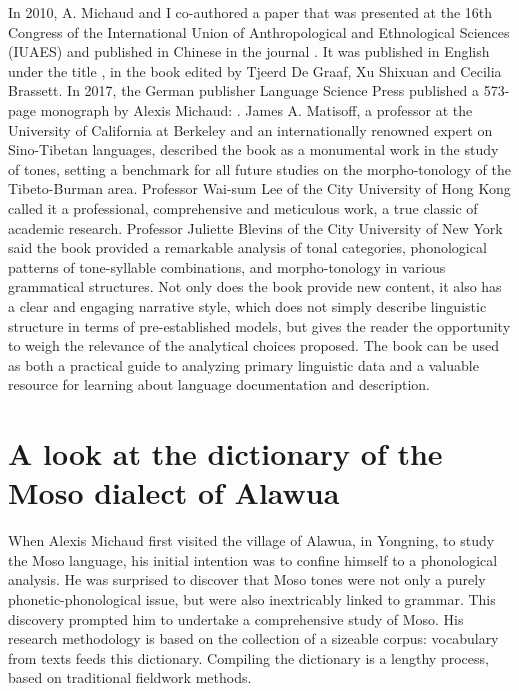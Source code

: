 In 2010, A. Michaud and I co-authored a paper that was presented at the 16th Congress of the International Union of Anthropological and Ethnological Sciences (IUAES) and published in Chinese in the journal . It was published in English under the title , in the book  edited by Tjeerd De Graaf, Xu Shixuan and Cecilia Brassett. In 2017, the German publisher Language Science Press published a 573-page monograph by Alexis Michaud: \emph{}. James A. Matisoff, a professor at the University of California at Berkeley and an internationally renowned expert on Sino-Tibetan languages, described the book as a monumental work in the study of tones, setting a benchmark for all future studies on the morpho-tonology of the Tibeto-Burman area. Professor Wai-sum Lee of the City University of Hong Kong called it a professional, comprehensive and meticulous work, a true classic of academic research. Professor Juliette Blevins of the City University of New York said the book provided a remarkable analysis of tonal categories, phonological patterns of tone-syllable combinations, and morpho-tonology in various grammatical structures. Not only does the book provide new content, it also has a clear and engaging narrative style, which does not simply describe linguistic structure in terms of pre-established models, but gives the reader the opportunity to weigh the relevance of the analytical choices proposed. The book can be used as both a practical guide to analyzing primary linguistic data and a valuable resource for learning about language documentation and description.

\section*{A look at the dictionary of the Moso dialect of Alawua}

When Alexis Michaud first visited the village of Alawua, in Yongning, to study the Moso language, his initial intention was to confine himself to a phonological analysis. He was surprised to discover that Moso tones were not only a purely phonetic-phonological issue, but were also inextricably linked to grammar. This discovery prompted him to undertake a comprehensive study of Moso. His research methodology is based on the collection of a sizeable corpus: vocabulary from texts feeds this dictionary. Compiling the dictionary is a lengthy process, based on traditional fieldwork methods.

